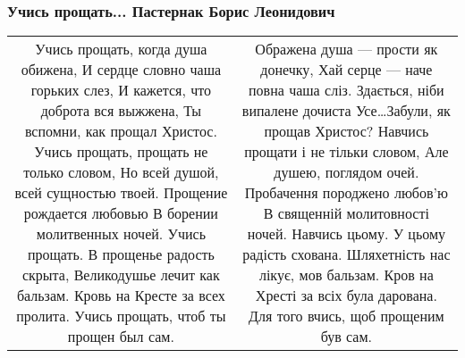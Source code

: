  
 
 

\subsubsection{Учись прощать... Пастернак Борис Леонидович}
\label{sec:poetry.rus.svetlana_gruzdeva.uchis_proschat}


\begin{longtable}{cc}

Учись прощать, когда душа обижена,
И сердце словно чаша горьких слез,
И кажется, что доброта вся выжжена,
Ты вспомни, как прощал Христос.
Учись прощать, прощать не только словом,
Но всей душой, всей сущностью твоей.
Прощение рождается любовью
В борении молитвенных ночей.
Учись прощать. В прощенье радость скрыта,
Великодушье лечит как бальзам.
Кровь на Кресте за всех пролита.
Учись прощать, чтоб ты прощен был сам.

&

Ображена душа --- прости як донечку,
Хай серце --- наче повна чаша сліз.
Здається, ніби випалене дочиста
Усе…Забули, як прощав Христос?
Навчись прощати і не тільки словом,
Але душею, поглядом очей.
Пробачення породжено любов'ю
В священній молитовності ночей.
Навчись цьому. У цьому радість схована.
Шляхетність нас лікує, мов бальзам.
Кров на Хресті за всіх була дарована.
Для того вчись, щоб прощеним був сам.
	
\end{longtable}

